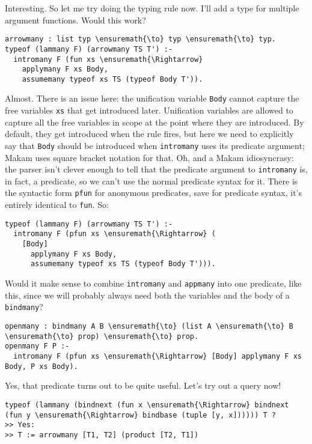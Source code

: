 \heroSTUDENT{} Interesting. So let me try doing the typing rule now. I'll add
a type for multiple argument functions. Would this work?

\begin{verbatim}
arrowmany : list typ \ensuremath{\to} typ \ensuremath{\to} typ.
typeof (lammany F) (arrowmany TS T') :-
  intromany F (fun xs \ensuremath{\Rightarrow}
    applymany F xs Body,
    assumemany typeof xs TS (typeof Body T')).
\end{verbatim}

\heroADVISOR{} Almost. There is an issue here: the unification variable
\texttt{Body} cannot capture the free variables \texttt{xs} that get
introduced later. Unification variables are allowed to capture all the
free variables in scope at the point where they are introduced. By
default, they get introduced when the rule fires, but here we need to
explicitly say that \texttt{Body} should be introduced when
\texttt{intromany} uses its predicate argument; Makam uses square
bracket notation for that. Oh, and a Makam idiosyncrasy: the parser
isn't clever enough to tell that the predicate argument to
\texttt{intromany} is, in fact, a predicate, so we can't use the normal
predicate syntax for it. There is the syntactic form \texttt{pfun} for
anonymous predicates, save for predicate syntax, it's entirely identical
to \texttt{fun}. So:

\begin{verbatim}
typeof (lammany F) (arrowmany TS T') :-
  intromany F (pfun xs \ensuremath{\Rightarrow} (
    [Body]
      applymany F xs Body,
      assumemany typeof xs TS (typeof Body T'))).
\end{verbatim}

\heroSTUDENT{} Would it make sense to combine \texttt{intromany} and
\texttt{appmany} into one predicate, like this, since we will probably
always need both the variables and the body of a \texttt{bindmany}?

\begin{verbatim}
openmany : bindmany A B \ensuremath{\to} (list A \ensuremath{\to} B \ensuremath{\to} prop) \ensuremath{\to} prop.
openmany F P :-
  intromany F (pfun xs \ensuremath{\Rightarrow} [Body] applymany F xs Body, P xs Body).
\end{verbatim}

\heroADVISOR{} Yes, that predicate turns out to be quite useful. Let's try out
a query now!

\begin{verbatim}
typeof (lammany (bindnext (fun x \ensuremath{\Rightarrow} bindnext (fun y \ensuremath{\Rightarrow} bindbase (tuple [y, x]))))) T ?
>> Yes:
>> T := arrowmany [T1, T2] (product [T2, T1])
\end{verbatim}

